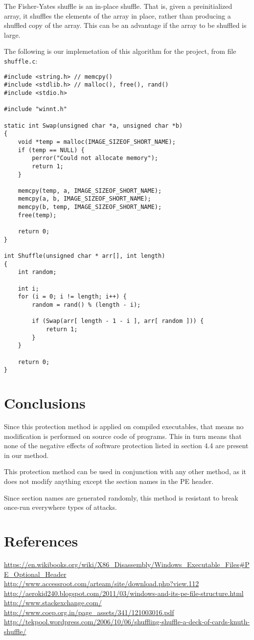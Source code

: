 \documentclass[a4paper,12pt]{article}
\begin{document}
The Fisher-Yates shuffle is an in-place shuffle. That is, given a
preinitialized array, it shuffles the elements of the array in place, rather
than producing a shuffled copy of the array. This can be an advantage if the
array to be shuffled is large.

The following is our implemetation of this algorithm for the project, from file
\texttt{shuffle.c}:

\begin{verbatim}
#include <string.h> // memcpy()
#include <stdlib.h> // malloc(), free(), rand()
#include <stdio.h>

#include "winnt.h"

static int Swap(unsigned char *a, unsigned char *b)
{
    void *temp = malloc(IMAGE_SIZEOF_SHORT_NAME);
    if (temp == NULL) {
        perror("Could not allocate memory");
        return 1;
    }

    memcpy(temp, a, IMAGE_SIZEOF_SHORT_NAME);
    memcpy(a, b, IMAGE_SIZEOF_SHORT_NAME);
    memcpy(b, temp, IMAGE_SIZEOF_SHORT_NAME);
    free(temp);

    return 0;
}

int Shuffle(unsigned char * arr[], int length)
{
    int random;

    int i;
    for (i = 0; i != length; i++) {
        random = rand() % (length - i);

        if (Swap(arr[ length - 1 - i ], arr[ random ])) {
            return 1;
        }
    }

    return 0;
}
\end{verbatim}

\section{Conclusions}
Since this protection method is applied on compiled executables, that means no
modification is performed on source code of programs. This in turn means that
none of the negative effects of software protection listed in section 4.4 are
present in our method.

This protection method can be used in conjunction with any other method, as it
does not modify anything except the section names in the PE header.

Since section names are generated randomly, this method is
resistant to break once-run everywhere types of attacks.

\section{References}
\url{https://en.wikibooks.org/wiki/X86_Disassembly/Windows_Executable_Files#PE_Optional_Header}\\
\url{http://www.accessroot.com/arteam/site/download.php?view.112}\\
\url{http://aerokid240.blogspot.com/2011/03/windows-and-its-pe-file-structure.html}\\
\url{http://www.stackexchange.com/}\\
\url{http://www.coep.org.in/page_assets/341/121003016.pdf}\\
\url{http://tekpool.wordpress.com/2006/10/06/shuffling-shuffle-a-deck-of-cards-knuth-shuffle/}
\end{document}
